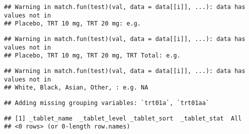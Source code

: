 \documentclass[
]{article}
\newenvironment{Shaded}{\begin{snugshade}}{\end{snugshade}}
\newcommand{\AttributeTok}[1]{\textcolor[rgb]{0.77,0.63,0.00}{#1}}
\newcommand{\CommentTok}[1]{\textcolor[rgb]{0.56,0.35,0.01}{\textit{#1}}}
\newcommand{\DecValTok}[1]{\textcolor[rgb]{0.00,0.00,0.81}{#1}}
\newcommand{\FunctionTok}[1]{\textcolor[rgb]{0.00,0.00,0.00}{#1}}
\newcommand{\NormalTok}[1]{#1}
\newcommand{\OtherTok}[1]{\textcolor[rgb]{0.56,0.35,0.01}{#1}}
\newcommand{\SpecialCharTok}[1]{\textcolor[rgb]{0.00,0.00,0.00}{#1}}
\newcommand{\StringTok}[1]{\textcolor[rgb]{0.31,0.60,0.02}{#1}}
\begin{document}
\begin{verbatim}
## Warning in match.fun(test)(val, data = data[[i]], ...): data has values not in
## Placebo, TRT 10 mg, TRT 20 mg: e.g.
\end{verbatim}

\begin{verbatim}
## Warning in match.fun(test)(val, data = data[[i]], ...): data has values not in
## Placebo, TRT 10 mg, TRT 20 mg, TRT Total: e.g.
\end{verbatim}

\begin{verbatim}
## Warning in match.fun(test)(val, data = data[[i]], ...): data has values not in
## White, Black, Asian, Other, : e.g. NA
\end{verbatim}

\begin{Shaded}
\end{Shaded}

\begin{verbatim}
## Adding missing grouping variables: `trt01a`, `trt01aa`
\end{verbatim}

\begin{verbatim}
## [1] _tablet_name  _tablet_level _tablet_sort  _tablet_stat  All          
## <0 rows> (or 0-length row.names)
\end{verbatim}
\end{document}
